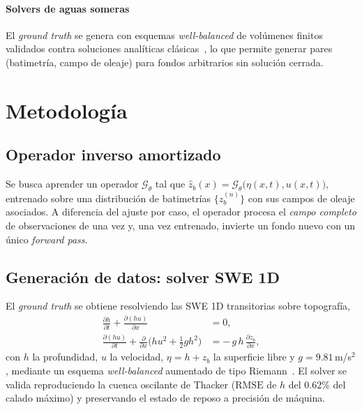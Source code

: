 \documentclass[conference]{IEEEtran}
\newcommand{\zb}{z_b}
\newcommand{\RMSE}{\mathrm{RMSE}}
\newcommand{\pd}[2]{\frac{\partial #1}{\partial #2}}
\begin{document}
\paragraph*{Solvers de aguas someras}
El \emph{ground truth} se genera con esquemas \emph{well-balanced} de volúmenes
finitos~\cite{audusse2004,leveque2002} validados contra soluciones analíticas
clásicas~\cite{thacker1981,delestre2013}, lo que permite generar pares
(batimetría, campo de oleaje) para fondos arbitrarios sin solución cerrada.

\section{Metodología}
\label{sec:method}

\subsection{Operador inverso amortizado}
Se busca aprender un operador $\mathcal{G}_\theta$ tal que
$\hat\zb(x) = \mathcal{G}_\theta\big(\eta(x,t), u(x,t)\big)$, entrenado sobre una
distribución de batimetrías $\{\zb^{(n)}\}$ con sus campos de oleaje asociados.
A diferencia del ajuste por caso, el operador procesa el \emph{campo completo}
de observaciones de una vez y, una vez entrenado, invierte un fondo nuevo con un
único \emph{forward pass}.

\subsection{Generación de datos: solver SWE 1D}
El \emph{ground truth} se obtiene resolviendo las SWE 1D transitorias sobre
topografía,
\begin{align}
  \pd{h}{t} + \pd{(hu)}{x} &= 0, \label{eq:swe-cont}\\
  \pd{(hu)}{t} + \pd{}{x}\!\Big(hu^2 + \tfrac{1}{2}gh^2\Big)
    &= -\,g\,h\,\pd{\zb}{x}, \label{eq:swe-mom}
\end{align}
con $h$ la profundidad, $u$ la velocidad, $\eta = h+\zb$ la superficie libre y
$g=9.81$\,m/s$^2$, mediante un esquema \emph{well-balanced} aumentado de tipo
Riemann~\cite{audusse2004}. El solver se valida reproduciendo la cuenca oscilante
de Thacker ($\RMSE$ de $h$ del $0.62\%$ del calado máximo) y preservando el
estado de reposo a precisión de máquina.
\end{document}
